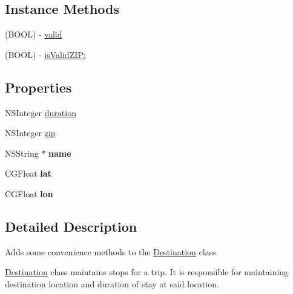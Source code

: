 \subsection*{Instance Methods}
\begin{DoxyCompactItemize}
\item 
(B\-O\-O\-L) -\/ \hyperlink{interface_destination_ae33ba4170b0e92f1b94ae6f21f5c3dbb}{valid}
\item 
(B\-O\-O\-L) -\/ \hyperlink{interface_destination_a906246f5d15394fa5d8f5fee672537e1}{is\-Valid\-Z\-I\-P\-:}
\end{DoxyCompactItemize}
\subsection*{Properties}
\begin{DoxyCompactItemize}
\item 
N\-S\-Integer \hyperlink{interface_destination_a83a4c63fc216c137f29aadaa4be1fda2}{duration}
\item 
N\-S\-Integer \hyperlink{interface_destination_ac3fa98f68bc95bf00852743e1b3d3f9a}{zip}
\item 
\hypertarget{interface_destination_ab21be07a3201646736da1899501cb46c}{N\-S\-String $\ast$ {\bfseries name}}\label{interface_destination_ab21be07a3201646736da1899501cb46c}

\item 
\hypertarget{interface_destination_af6e9f0de5a758bd0572864f45a5040e6}{C\-G\-Float {\bfseries lat}}\label{interface_destination_af6e9f0de5a758bd0572864f45a5040e6}

\item 
\hypertarget{interface_destination_ad9d95f6874e1ff4f73ea4f69c60c093a}{C\-G\-Float {\bfseries lon}}\label{interface_destination_ad9d95f6874e1ff4f73ea4f69c60c093a}

\end{DoxyCompactItemize}


\subsection{Detailed Description}
Adds some convenience methods to the \hyperlink{interface_destination}{Destination} class

\hyperlink{interface_destination}{Destination} class maintains stops for a trip. It is responsible for maintaining destination location and duration of stay at said location. 

